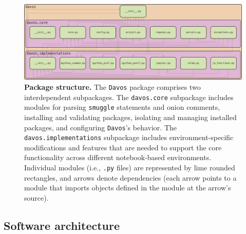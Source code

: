 \documentclass[preprint,12pt,a4paper]{elsarticle}
\begin{document}
\begin{figure}[tp]
\centering
\includegraphics[width=\textwidth]{figs/package_structure}
\caption{\small \textbf{Package structure.} The \texttt{Davos} package
  comprises two interdependent subpackages. The \texttt{davos.core}
  subpackage includes modules for parsing \texttt{smuggle} statements
  and onion comments, installing and validating packages, isolating and managing
  installed packages, and configuring \texttt{Davos}'s behavior. The
  \texttt{davos.implementations} subpackage includes
  environment-specific modifications and features that are needed to
  support the core functionality across different notebook-based
  environments. Individual modules (i.e., \texttt{.py} files) are represented by lime
  rounded rectangles, and arrows denote dependencies (each arrow
  points to a module that imports objects defined in the module at the
  arrow's source).}
\label{fig:package-structure}
\end{figure}


\subsection{Software architecture}\label{sec:architecture}
\end{document}
